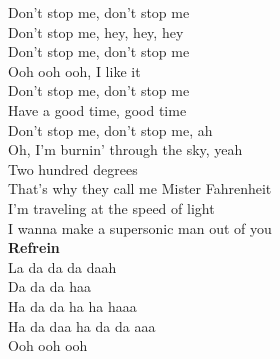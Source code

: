 Don't stop me, don't stop me\\
Don't stop me, hey, hey, hey\\
Don't stop me, don't stop me\\
Ooh ooh ooh, I like it\\
Don't stop me, don't stop me\\
Have a good time, good time\\
Don't stop me, don't stop me, ah\\

Oh, I'm burnin' through the sky, yeah\\
Two hundred degrees\\
That's why they call me Mister Fahrenheit\\
I'm traveling at the speed of light\\
I wanna make a supersonic man out of you\\

\textbf{Refrein}\\

La da da da daah\\
Da da da haa\\
Ha da da ha ha haaa\\
Ha da daa ha da da aaa\\
Ooh ooh ooh\\
